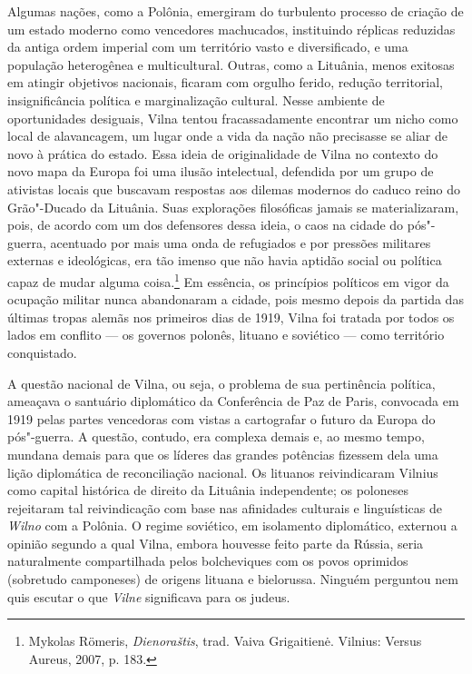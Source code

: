 Algumas nações, como a Polônia, emergiram do turbulento processo de
criação de um estado moderno como vencedores machucados, instituindo
réplicas reduzidas da antiga ordem imperial com um território vasto e
diversificado, e uma população heterogênea e multicultural. Outras, como
a Lituânia, menos exitosas em atingir objetivos nacionais, ficaram com
orgulho ferido, redução territorial, insignificância política e
marginalização cultural. Nesse ambiente de oportunidades desiguais,
Vilna tentou fracassadamente encontrar um nicho como local de
alavancagem, um lugar onde a vida da nação não precisasse se aliar de
novo à prática do estado. Essa ideia de originalidade de Vilna no
contexto do novo mapa da Europa foi uma ilusão intelectual, defendida
por um grupo de ativistas locais que buscavam respostas aos dilemas
modernos do caduco reino do Grão"-Ducado da Lituânia. Suas explorações
filosóficas jamais se materializaram, pois, de acordo com um dos
defensores dessa ideia, o caos na cidade do pós"-guerra, acentuado por
mais uma onda de refugiados e por pressões militares externas e
ideológicas, era tão imenso que não havia aptidão social ou política
capaz de mudar alguma coisa.\footnote{Mykolas Römeris, \textit{Dienoraštis}, trad. Vaiva Grigaitienė. Vilnius: Versus Aureus, 2007, p. 183.} Em essência, os princípios políticos em vigor da ocupação militar nunca abandonaram a cidade, pois mesmo depois da
partida das últimas tropas alemãs nos primeiros dias de 1919, Vilna foi
tratada por todos os lados em conflito --- os governos polonês, lituano e
soviético --- como território conquistado.

A questão nacional de Vilna, ou seja, o problema de sua pertinência
política, ameaçava o santuário diplomático da Conferência de Paz de
Paris, convocada em 1919 pelas partes vencedoras com vistas a
cartografar o futuro da Europa do pós"-guerra. A questão, contudo, era
complexa demais e, ao mesmo tempo, mundana demais para que os líderes
das grandes potências fizessem dela uma lição diplomática de
reconciliação nacional. Os lituanos reivindicaram Vilnius como capital
histórica de direito da Lituânia independente; os poloneses rejeitaram
tal reivindicação com base nas afinidades culturais e linguísticas de
\textit{Wilno} com a Polônia. O regime soviético, em isolamento diplomático,
externou a opinião segundo a qual Vilna, embora houvesse feito parte da
Rússia, seria naturalmente compartilhada pelos bolcheviques com os povos
oprimidos (sobretudo camponeses) de origens lituana e bielorussa. Ninguém
perguntou nem quis escutar o que \textit{Vilne} significava para os judeus.

